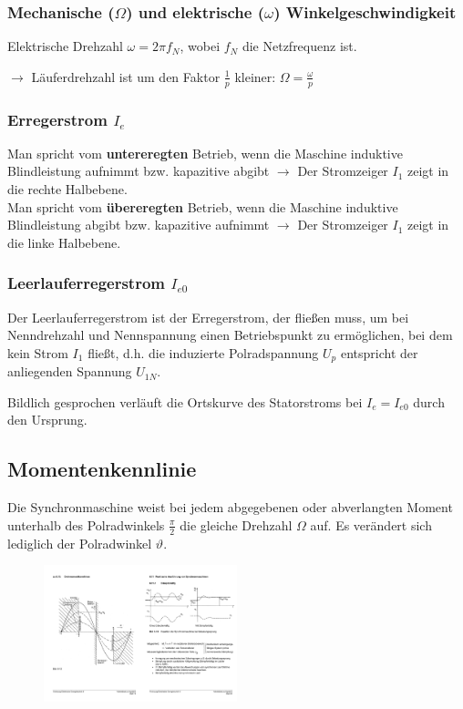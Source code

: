 \documentclass[11pt]{article}
\begin{document}
\subsubsection*{Mechanische ($\Omega$) und elektrische ($\omega$) Winkelgeschwindigkeit}
Elektrische Drehzahl $\omega = 2 \pi f_N$, wobei $f_N$ die Netzfrequenz ist.

\vspace{.5em}
$\rightarrow$ Läuferdrehzahl ist um den Faktor $\frac{1}{p}$ kleiner: $\Omega=\frac{\omega}{p}$\\

\subsubsection*{Erregerstrom $I_e$}
Man spricht vom \textbf{untereregten} Betrieb, wenn die Maschine induktive Blindleistung aufnimmt bzw. kapazitive abgibt $\rightarrow$ Der Stromzeiger $I_1$ zeigt in die rechte Halbebene.\\
Man spricht vom \textbf{übereregten} Betrieb, wenn die Maschine induktive Blindleistung abgibt bzw. kapazitive aufnimmt $\rightarrow$ Der Stromzeiger $I_1$ zeigt in die linke Halbebene.\\

\subsubsection*{Leerlauferregerstrom $I_{e0}$}
Der Leerlauferregerstrom ist der Erregerstrom, der fließen muss, um bei Nenndrehzahl und Nennspannung einen Betriebspunkt zu ermöglichen, bei dem kein Strom $I_1$ fließt, d.h. die induzierte Polradspannung $U_p$ entspricht der anliegenden Spannung $U_{1N}$.

\vspace{0.5em}
Bildlich gesprochen verläuft die Ortskurve des Statorstroms bei $I_e = I_{e0}$ durch den Ursprung.

\subsection*{Momentenkennlinie}
Die Synchronmaschine weist bei jedem abgegebenen oder abverlangten Moment unterhalb des Polradwinkels $\frac{\pi}{2}$ die gleiche Drehzahl $\Omega$ auf. Es verändert sich lediglich der Polradwinkel $\vartheta$.

\begin{figure}[H]
	\centering
	\includegraphics[width=0.5\textwidth]{img/SM_Kennlinie.pdf}
\end{figure}
\end{document}
